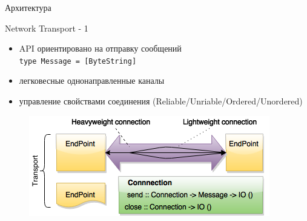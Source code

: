 \documentclass{beamer}
\begin{document}
\begin{frame}{Архитектура}
  \begin{figure}
    \centering
    \def\svgwidth{0.75\columnwidth}
    
  \end{figure}
\end{frame}

\begin{frame}{Network Transport - 1}
  \begin{itemize}
    \item API ориентировано на отправку сообщений \\
          \texttt{type Message = [ByteString]}
    \item легковесные однонаправленные каналы
    \item управление свойствами соединения (Reliable/Unriable/Ordered/Unordered)
 \end{itemize}
 \begin{figure}
   \includegraphics[width= \paperwidth]{images/c-h-n-t.png}
 \end{figure}
\end{frame}
\end{document}
